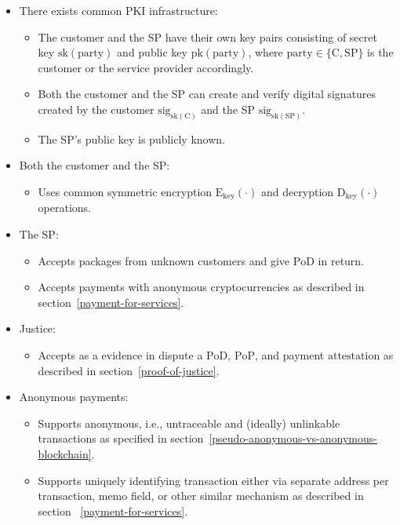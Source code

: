 \documentclass{ieeeaccess}
\begin{document}
\begin{itemize}
\item There exists common PKI infrastructure:
    \begin{itemize}
        \item The customer and the SP have their own key pairs consisting of secret key $\mathrm{sk}(\mathrm{party})$ and public key $\mathrm{pk}(\mathrm{party})$, where $\mathrm{party} \in \{\mathrm{C}, \mathrm{SP}\}$ is the customer or the service provider accordingly.
        \item Both the customer and the SP can create and verify digital signatures created by the customer $\mathrm{sig}_{\mathrm{sk}(\mathrm{C})}$ and the SP $\mathrm{sig}_{\mathrm{sk}(\mathrm{SP})}$.
        \item The SP's public key is publicly known.
    \end{itemize}
    
\item Both the customer and the SP:
    \begin{itemize}
        \item Uses common symmetric encryption $\mathrm{E}_\mathrm{key}(\cdot)$ and decryption $\mathrm{D}_\mathrm{key}(\cdot)$ operations.
    \end{itemize}

\item The SP:
    \begin{itemize}
        \item Accepts packages from unknown customers and give $\mathrm{PoD}$ in return.
        \item Accepts payments with anonymous cryptocurrencies as described in section~\ref{payment-for-services}.
    \end{itemize}
    
\item Justice:
    \begin{itemize}
        \item Accepts as a evidence in dispute a $\mathrm{PoD}$, $\mathrm{PoP}$, and payment $\mathrm{attestation}$ as described in section~\ref{proof-of-justice}.
    \end{itemize}

\item Anonymous payments:
    \begin{itemize}
        \item Supports anonymous, i.e., untraceable and (ideally) unlinkable transactions as specified in section~\ref{pseudo-anonymous-vs-anonymous-blockchain}.
        \item Supports uniquely identifying transaction either via separate address per transaction, memo field, or other similar mechanism as described in section ~\ref{payment-for-services}. 
    \end{itemize}


\end{itemize}
\end{document}
